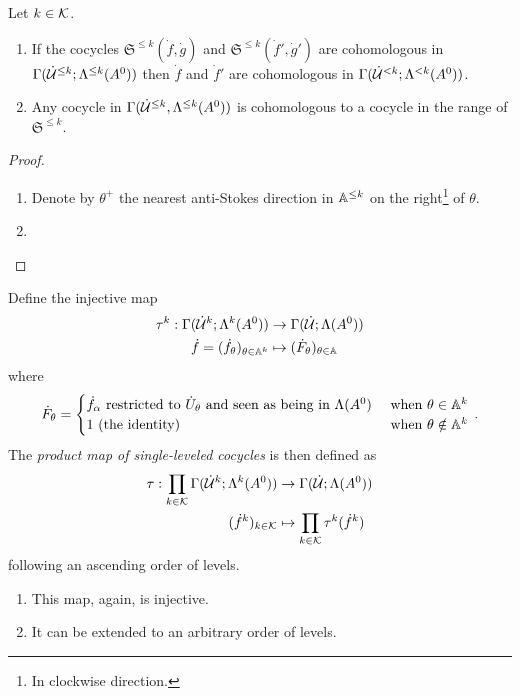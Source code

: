 \begin{lem}
  Let $k\in\mathcal{K}$.
  \begin{enumerate}
    \item If the cocycles $\mathfrak{S}^{\leq k}(\dot f,\dot g)$ and
      $\mathfrak{S}^{\leq k}(\dot f',\dot g')$ are cohomologous in
      $\Gamma(\dot{\mathcal{U}}^{\leq k};\Lambda^{\leq k}(A^0))$
      then $\dot f$ and $\dot f'$ are cohomologous in
      $\Gamma(\dot{\mathcal{U}}^{<k};\Lambda^{<k}(A^0))$.
    \item Any cocycle in $\Gamma(\dot{\mathcal{U}}^{\leq k},\Lambda^{\leq k}(A^0))$ is
      cohomologous to a cocycle in the range of $\mathfrak{S}^{\leq k}$.
  \end{enumerate}
\end{lem}
\begin{proof}
  \begin{enumerate}
    \item Denote by $\theta^+$ the nearest anti-Stokes direction in
      $\mathbb{A}^{\leq k}$ on the right\footnote{In clockwise direction.} of $\theta$.
      \TODO{}
    \item \TODO{}
  \end{enumerate}
  \TODO{}
\end{proof}
\begin{defn}\label{defn:theMapTau}
  Define the injective map
  \begin{align*}
    \tau^k:\Gamma(\dot{\mathcal{U}}^k;\Lambda^k(A^0)) &\to \Gamma(\dot{\mathcal{U}};\Lambda(A^0))
  \\\dot f=(\dot f_\theta)_{\theta\in\mathbb{A}^k} &\mapsto
    (\dot F_\theta)_{\theta\in\mathbb{A}}
  \end{align*}
  where
  \[
    \dot F_\theta=\begin{cases}
      \dot f_\alpha \text{~restricted to } \dot U_\theta
      \text{~and seen as being in } \Lambda(A^0)
      & \text{~when } \theta\in\mathbb{A}^k
    \\1 \text{~(the identity) }
      & \text{~when } \theta\notin\mathbb{A}^k
    \end{cases} \,.
  \]
  The \emph{product map of single-leveled cocycles} is then defined as
  \begin{align*}
    \tau:\prod_{k\in\mathcal{K}}\Gamma(\dot {\mathcal{U}}^k;\Lambda^k(A^0))
    &\to
    \Gamma(\dot{\mathcal{U}};\Lambda(A^0))
  \\(\dot f^k)_{k\in\mathcal{K}}
    &\mapsto
    \prod_{k\in\mathcal{K}}\tau^k(\dot f^k)
  \end{align*}
  following an ascending order of levels.
  \begin{s-rem}
    \begin{enumerate}
      \item This map, again, is injective.
        \TODO[proof?]
      \item It can be extended to an arbitrary order of levels.
    \end{enumerate}
  \end{s-rem}
\end{defn}
